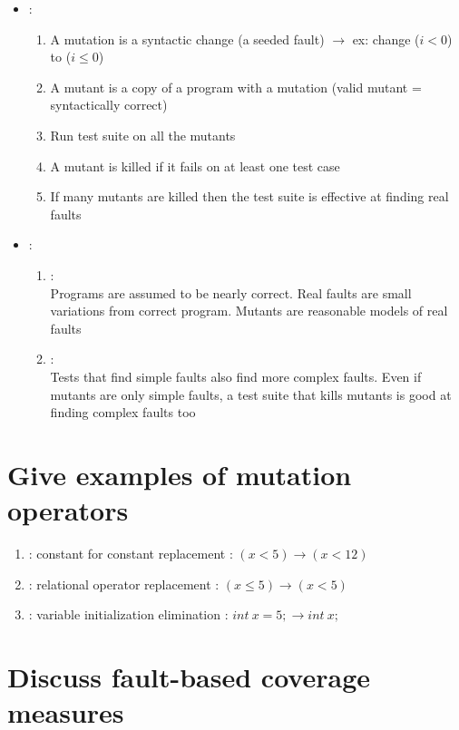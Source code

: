 \begin{itemize}
    \item {} :
    \begin{enumerate}
        \item A mutation is a syntactic change (a seeded fault) $\rightarrow$ ex: change ($i<0$) to ($i\leq0$)
        \item A mutant is a copy of a program with a mutation (valid mutant = syntactically correct)
        \item Run test suite on all the mutants
        \item A mutant is killed if it fails on at least one test case
        \item If many mutants are killed then the test suite is effective at finding real faults
    \end{enumerate}
    \item {} :
    \begin{enumerate}
        \item {} :\\
        Programs are assumed to be nearly correct. Real faults are small variations from correct program. Mutants are reasonable models of real faults
        \item {} : \\
        Tests that find simple faults also find more complex faults. Even if mutants are only simple faults, a test suite that kills mutants is good at finding complex faults too
    \end{enumerate}
\end{itemize}

\section{Give examples of mutation operators}

\begin{enumerate}
    \item {}: constant for constant replacement : $(x < 5) \rightarrow (x < 12)$
    \item {}: relational operator replacement : $(x \leq 5) \rightarrow (x < 5)$
    \item {}: variable initialization elimination : $int\ x = 5; \rightarrow int\ x;$
\end{enumerate}

\section{Discuss fault-based coverage measures}


